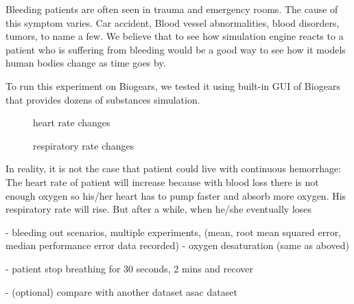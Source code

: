 \documentclass[a4paper]{article}
\begin{document}
Bleeding patients are often seen in trauma and emergency rooms. The cause of this symptom varies. Car accident, Blood vessel abnormalities, blood disorders, tumors, to name a few. We believe that to see how simulation engine reacts to a patient who is suffering from bleeding would be a good way to see how it models human bodies change as time goes by.

To run this experiment on Biogears, we tested it using built-in GUI of Biogears that provides dozens of substances simulation.  


\begin{figure}[!htb]\centering
   \begin{minipage}{0.49\textwidth}
     \caption{heart rate changes}
     \label{fig:patient bleeding}
     
   \end{minipage}
   \begin {minipage}{0.49\textwidth}
     \caption{respiratory rate changes}
     \label{fig:patient bleeding}
   \end{minipage}
\end{figure}

In reality, it is not the case that patient could live with continuous hemorrhage: The heart rate of patient will increase because with blood loss there is not enough oxygen so his/her heart has to pump faster and absorb more oxygen. His respiratory rate will rise. But after a while, when he/she eventually loses


- bleeding out scenarios, multiple experiments, (mean, root mean squared error, median performance error data recorded)
- oxygen desaturation (same as aboved)

- patient stop breathing for 30 seconds, 2 mins and recover

- (optional) compare with another dataset asac dataset
\end{document}
